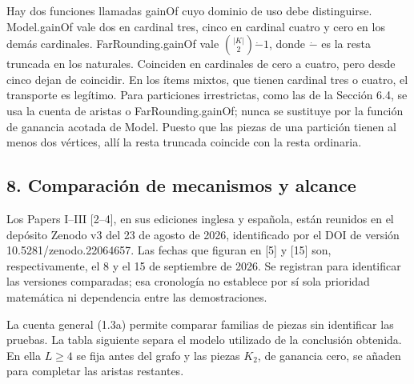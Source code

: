 \documentclass[spanish,11pt,a4paper]{article}
\begin{document}
Hay dos funciones llamadas {\ttfamily\small gainOf} cuyo dominio de uso debe distinguirse. {\ttfamily\small Model.\discretionary{\hbox{\ensuremath{\hookrightarrow}}}{}{}gainOf} vale dos en cardinal tres, cinco en cardinal cuatro y cero en los demás cardinales. {\ttfamily\small FarRounding.\discretionary{\hbox{\ensuremath{\hookrightarrow}}}{}{}gainOf} vale \(\binom{|K|}{2}\mathbin{\dot-}1\), donde \(\dot-\) es la resta truncada en los naturales. Coinciden en cardinales de cero a cuatro, pero desde cinco dejan de coincidir. En los ítems mixtos, que tienen cardinal tres o cuatro, el transporte es legítimo. Para particiones irrestrictas, como las de la Sección 6.4, se usa la cuenta de aristas o {\ttfamily\small FarRounding.\discretionary{\hbox{\ensuremath{\hookrightarrow}}}{}{}gainOf}; nunca se sustituye por la función de ganancia acotada de {\ttfamily\small Model}. Puesto que las piezas de una partición tienen al menos dos vértices, allí la resta truncada coincide con la resta ordinaria.

\subsection{8. Comparación de mecanismos y alcance}\label{comparacion-de-mecanismos-y-alcance}

Los Papers I--III {[}2--4{]}, en sus ediciones inglesa y española, están reunidos en el depósito Zenodo v3 del 23 de agosto de 2026, identificado por el DOI de versión {\ttfamily\small 10.\discretionary{\hbox{\ensuremath{\hookrightarrow}}}{}{}5281/\discretionary{\hbox{\ensuremath{\hookrightarrow}}}{}{}zenodo.\discretionary{\hbox{\ensuremath{\hookrightarrow}}}{}{}22064657}. Las fechas que figuran en {[}5{]} y {[}15{]} son, respectivamente, el 8 y el 15 de septiembre de 2026. Se registran para identificar las versiones comparadas; esa cronología no establece por sí sola prioridad matemática ni dependencia entre las demostraciones.

La cuenta general (1.3a) permite comparar familias de piezas sin identificar las pruebas. La tabla siguiente separa el modelo utilizado de la conclusión obtenida. En ella \(L\ge4\) se fija antes del grafo y las piezas \(K_2\), de ganancia cero, se añaden para completar las aristas restantes.

\end{document}
